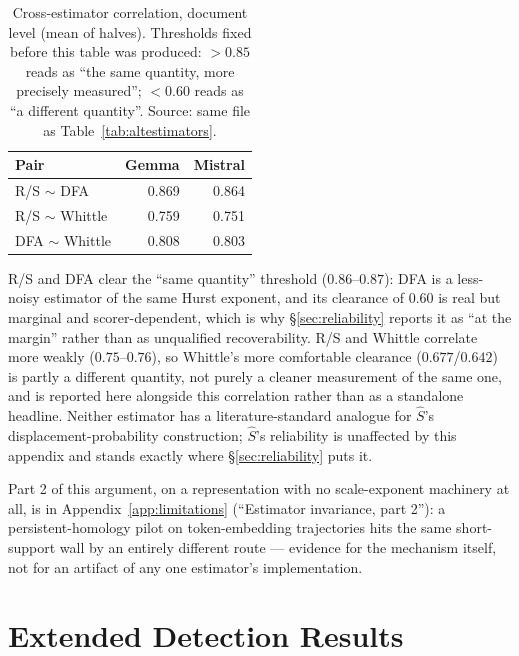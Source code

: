 \documentclass{article}
\newcommand{\Sest}{\ensuremath{\widehat{S}}}
\begin{document}
\begin{table}[h]
\centering
\footnotesize
\caption{Cross-estimator correlation, document level (mean of halves).
Thresholds fixed before this table was produced: $>0.85$ reads as ``the same
quantity, more precisely measured''; $<0.60$ reads as ``a different quantity''.
Source: same file as Table~\ref{tab:altestimators}.}
\label{tab:crossestimator}
\begin{tabular}{lrr}
\toprule
Pair & Gemma & Mistral \\
\midrule
R/S $\sim$ DFA     & 0.869 & 0.864 \\
R/S $\sim$ Whittle  & 0.759 & 0.751 \\
DFA $\sim$ Whittle & 0.808 & 0.803 \\
\bottomrule
\end{tabular}
\end{table}

R/S and DFA clear the ``same quantity'' threshold ($0.86$--$0.87$): DFA is a
less-noisy estimator of the same Hurst exponent, and its clearance of $0.60$ is
real but marginal and scorer-dependent, which is why \S\ref{sec:reliability}
reports it as ``at the margin'' rather than as unqualified recoverability. R/S
and Whittle correlate more weakly ($0.75$--$0.76$), so Whittle's more
comfortable clearance ($0.677$/$0.642$) is partly a different quantity, not
purely a cleaner measurement of the same one, and is reported here alongside
this correlation rather than as a standalone headline. Neither estimator has a
literature-standard analogue for \Sest's displacement-probability construction;
\Sest's reliability is unaffected by this appendix and stands exactly where
\S\ref{sec:reliability} puts it.

Part 2 of this argument, on a representation with no scale-exponent machinery
at all, is in Appendix~\ref{app:limitations} (``Estimator invariance, part
2''): a persistent-homology pilot on token-embedding trajectories hits the
same short-support wall by an entirely different route --- evidence for the
mechanism itself, not for an artifact of any one estimator's implementation.

\section{Extended Detection Results}
\label{app:detection}
\end{document}
